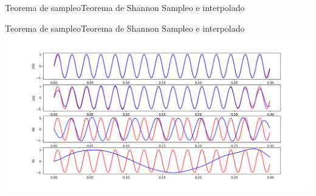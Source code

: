  \begin{frame}{Teorema de sampleo}{Teorema de Shannon}
    \handsonicon
    Sampleo e interpolado
       
    \vfill
 \end{frame}
 \begin{frame}{Teorema de sampleo}{Teorema de Shannon}
    \handsonicon
    Sampleo e interpolado
    \center\includegraphics[width=1.0\textwidth]{1_clase/teorema_sampleo_interpolado}
    \vfill
 \end{frame}

